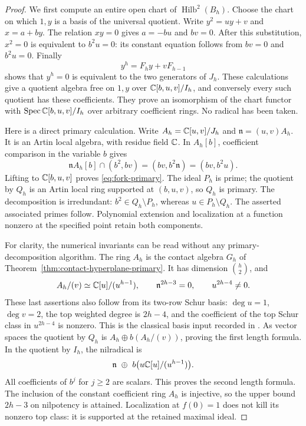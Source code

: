 \begin{proof}
We first compute an entire open chart of $\operatorname{Hilb}^2(B_h)$.
Choose the chart on which $1,y$ is a basis of the universal quotient.
Write $y^2=uy+v$ and $x=a+by$. The relation $xy=0$ gives
$a=-bu$ and $bv=0$. After this substitution, $x^2=0$ is equivalent
to $b^2u=0$: its constant equation follows from $bv=0$ and $b^2u=0$.
Finally
\[
 y^h=F_h y+vF_{h-1}
\]
shows that $y^h=0$ is equivalent to the two generators of $J_h$.
These calculations give a quotient algebra free on $1,y$ over
$\mathbb C[b,u,v]/I_h$, and conversely every such quotient has these
coefficients. They prove an isomorphism of the chart functor with
$\operatorname{Spec}\mathbb C[b,u,v]/I_h$ over arbitrary coefficient rings.
No radical has been taken.

Here is a direct primary calculation. Write
$A_h=\mathbb C[u,v]/J_h$ and $\mathfrak n=(u,v)A_h$. It is an Artin
local algebra, with residue field $\mathbb C$. In $A_h[b]$, coefficient
comparison in the variable $b$ gives
\[
 \mathfrak n A_h[b]\cap (b^2,bv)
       =(bv,b^2\mathfrak n)=(bv,b^2u).
\]
Lifting to $\mathbb C[b,u,v]$ proves \eqref{eq:fork-primary}.
The ideal $P_h$ is prime; the quotient by $Q_h$ is an Artin local
ring supported at $(b,u,v)$, so $Q_h$ is primary. The decomposition
is irredundant: $b^2\in Q_h\setminus P_h$, whereas
$u\in P_h\setminus Q_h$. The asserted associated primes follow.
Polynomial extension and localization at a function nonzero at the
specified point retain both components.

For clarity, the numerical invariants can be read without any
primary-decomposition algorithm. The ring $A_h$ is the contact
algebra $G_h$ of Theorem~\ref{thm:contact-hyperplane-primary}.
It has dimension $\binom h2$, and
\[
 A_h/(v)\simeq\mathbb C[u]/(u^{h-1}),\qquad
 \mathfrak n^{2h-3}=0,\qquad u^{2h-4}\ne0.
\]
These last assertions also follow from its two-row Schur basis:
$\deg u=1$, $\deg v=2$, the top weighted degree is $2h-4$, and the
coefficient of the top Schur class in $u^{2h-4}$ is nonzero.
This is the classical basis input recorded in \cite{Grinberg}.
As vector spaces the quotient by $Q_h$ is
$A_h\oplus b(A_h/(v))$, proving the first length formula.
In the quotient by $I_h$, the nilradical is
\[
 \mathfrak n\ \oplus\ b\bigl(u\C[u]/(u^{h-1})\bigr).
\]
All coefficients of $b^j$ for $j\ge2$ are scalars. This proves the
second length formula. The inclusion of the constant coefficient
ring $A_h$ is injective, so the upper bound $2h-3$ on nilpotency is
attained. Localization at $f(0)=1$ does not kill its nonzero top
class: it is supported at the retained maximal ideal.


\end{proof}
